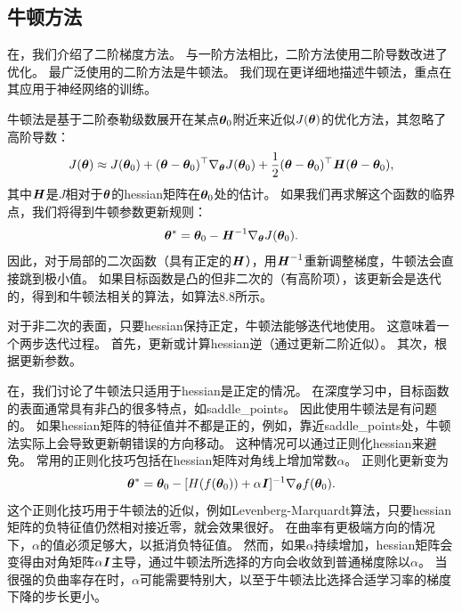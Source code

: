 
\subsection{牛顿方法}
\label{sec:newton_method}
在，我们介绍了二阶梯度方法。
与一阶方法相比，二阶方法使用二阶导数改进了优化。
最广泛使用的二阶方法是牛顿法。
我们现在更详细地描述牛顿法，重点在其应用于神经网络的训练。

牛顿法是基于二阶泰勒级数展开在某点$\boldsymbol{\theta}_0$附近来近似$J(\boldsymbol{\theta})$的优化方法，其忽略了高阶导数：
\begin{equation}
    J(\boldsymbol{\theta}) \approx J(\boldsymbol{\theta}_0) + (\boldsymbol{\theta} - \boldsymbol{\theta}_0)^\top \nabla_{\boldsymbol{\theta}}   
    J(\boldsymbol{\theta}_0) + \frac{1}{2} (\boldsymbol{\theta} - \boldsymbol{\theta}_0)^\top \boldsymbol{\mathit{H}}(\boldsymbol{\theta} - \boldsymbol{\theta}_0),
\end{equation}
其中$\boldsymbol{\mathit{H}}$是$J$相对于$\boldsymbol{\theta}$的\gls{hessian}矩阵在$\boldsymbol{\theta}_0$处的估计。
如果我们再求解这个函数的临界点，我们将得到牛顿参数更新规则：
\begin{equation}
\label{eq:8.27}
    \boldsymbol{\theta}^* = \boldsymbol{\theta}_0 - \boldsymbol{\mathit{H}}^{-1}\nabla_{\boldsymbol{\theta}} J(\boldsymbol{\theta}_0).
\end{equation}
因此，对于局部的二次函数（具有正定的$\boldsymbol{\mathit{H}}$），用$\boldsymbol{\mathit{H}}^{-1}$重新调整梯度，牛顿法会直接跳到极小值。
如果目标函数是凸的但非二次的（有高阶项），该更新会是迭代的，得到和牛顿法相关的算法，如算法8.8所示。

对于非二次的表面，只要\gls{hessian}保持正定，牛顿法能够迭代地使用。
这意味着一个两步迭代过程。
首先，更新或计算\gls{hessian}逆（通过更新二阶近似）。
其次，根据更新参数。


在，我们讨论了牛顿法只适用于\gls{hessian}是正定的情况。
在深度学习中，目标函数的表面通常具有非凸的很多特点，如\gls{saddle_points}。
因此使用牛顿法是有问题的。
如果\gls{hessian}矩阵的特征值并不都是正的，例如，靠近\gls{saddle_points}处，牛顿法实际上会导致更新朝错误的方向移动。
这种情况可以通过正则化\gls{hessian}来避免。
常用的正则化技巧包括在\gls{hessian}矩阵对角线上增加常数$\alpha$。
正则化更新变为
\begin{equation}
    \boldsymbol{\theta}^* = \boldsymbol{\theta}_0 - [ H( f(\boldsymbol{\theta}_0)) + \alpha \boldsymbol{\mathit{I}}  ]^{-1} \nabla_{\boldsymbol{\theta}} f(\boldsymbol{\theta}_0).
\end{equation}
这个正则化技巧用于牛顿法的近似，例如Levenberg-Marquardt算法\citep{Levenberg44,Marquardt63}，只要\gls{hessian}矩阵的负特征值仍然相对接近零，就会效果很好。
在曲率有更极端方向的情况下，$\alpha$的值必须足够大，以抵消负特征值。
然而，如果$\alpha$持续增加，\gls{hessian}矩阵会变得由对角矩阵$\alpha \boldsymbol{\mathit{I}}$主导，通过牛顿法所选择的方向会收敛到普通梯度除以$\alpha$。
当很强的负曲率存在时，$\alpha$可能需要特别大，以至于牛顿法比选择合适学习率的梯度下降的步长更小。

